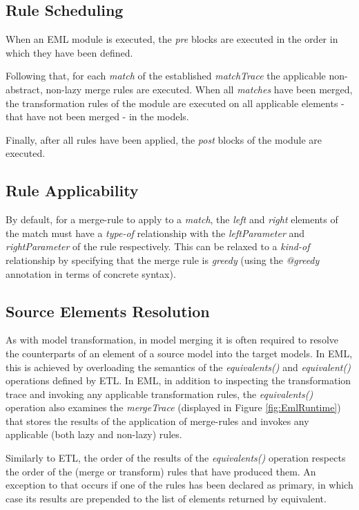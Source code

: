 \subsection{Rule Scheduling}
When an EML module is executed, the \emph{pre} blocks are executed in the order in which they have been defined.

Following that, for each \emph{match} of the established \emph{matchTrace} the applicable non-abstract, non-lazy merge rules are executed. When all \emph{matches} have been merged, the transformation rules of the module are executed on all applicable elements - that have not been merged - in the models.

Finally, after all rules have been applied, the \emph{post} blocks of the module are executed.

\subsection{Rule Applicability}
By default, for a merge-rule to apply to a \emph{match}, the \emph{left} and \emph{right} elements of the match must have a \emph{type-of} relationship with the \emph{leftParameter} and \emph{rightParameter} of the rule respectively. This can be relaxed to a \emph{kind-of} relationship by specifying that the merge rule is \emph{greedy} (using the \emph{@greedy} annotation in terms of concrete syntax).

\subsection{Source Elements Resolution}

As with model transformation, in model merging it is often required to resolve the counterparts of an element of a source model into the target models. In EML, this is achieved by overloading the semantics of the \emph{equivalents()} and \emph{equivalent()} operations defined by ETL. In EML, in addition to inspecting the transformation trace and invoking any applicable transformation rules, the \emph{equivalents()} operation also examines the \emph{mergeTrace} (displayed in Figure \ref{fig:EmlRuntime}) that stores the results of the application of merge-rules and invokes any applicable (both lazy and non-lazy) rules.

Similarly to ETL, the order of the results of the \emph{equivalents()} operation respects the order of the (merge or transform) rules that have produced them. An exception to that occurs if one of the rules has been declared as primary, in which case its results are prepended to the list of elements returned by equivalent.

